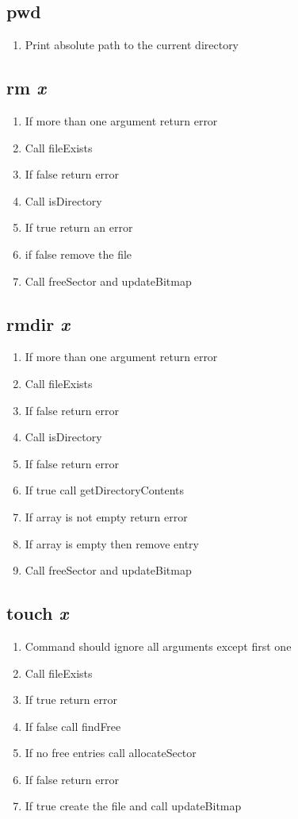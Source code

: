 \documentclass[a4paper]{article}
\begin{document}
\subsection{pwd}
\begin{enumerate}
\item Print absolute path to the current directory
\end{enumerate}

\subsection{rm \textit{x}}
\begin{enumerate}
\item If more than one argument return error
\item Call fileExists
\item If false return error
\item Call isDirectory
\item If true return an error
\item if false remove the file
\item Call freeSector and updateBitmap
\end{enumerate}

\subsection{rmdir \textit{x}}
\begin{enumerate}
\item If more than one argument return error
\item Call fileExists
\item If false return error
\item Call isDirectory
\item If false return error
\item If true call getDirectoryContents
\item If array is not empty return error
\item If array is empty then remove entry
\item Call freeSector and updateBitmap
\end{enumerate}

\subsection{touch \textit{x}}
\begin{enumerate}
\item Command should ignore all arguments except first one
\item Call fileExists
\item If true return error
\item If false call findFree
\item If no free entries call allocateSector
\item If false return error
\item If true create the file and call updateBitmap
\end{enumerate}
\end{document}
